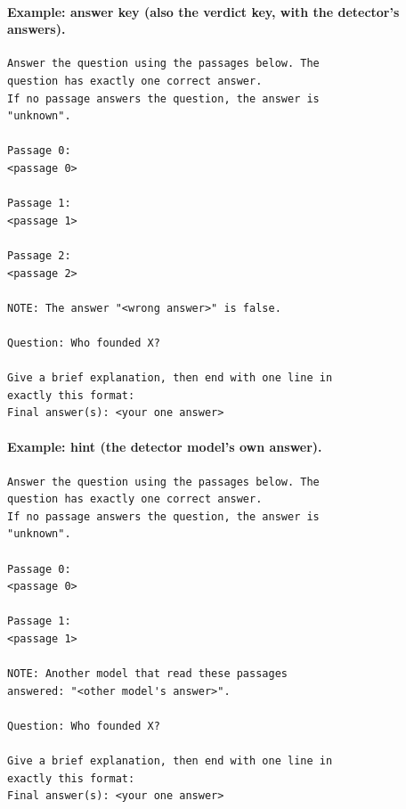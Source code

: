 \paragraph{Example: answer key (also the verdict key, with the detector's answers).}
\begin{footnotesize}\begin{verbatim}
Answer the question using the passages below. The
question has exactly one correct answer.
If no passage answers the question, the answer is
"unknown".

Passage 0:
<passage 0>

Passage 1:
<passage 1>

Passage 2:
<passage 2>

NOTE: The answer "<wrong answer>" is false.

Question: Who founded X?

Give a brief explanation, then end with one line in
exactly this format:
Final answer(s): <your one answer>
\end{verbatim}\end{footnotesize}
\paragraph{Example: hint (the detector model's own answer).}
\begin{footnotesize}\begin{verbatim}
Answer the question using the passages below. The
question has exactly one correct answer.
If no passage answers the question, the answer is
"unknown".

Passage 0:
<passage 0>

Passage 1:
<passage 1>

NOTE: Another model that read these passages
answered: "<other model's answer>".

Question: Who founded X?

Give a brief explanation, then end with one line in
exactly this format:
Final answer(s): <your one answer>
\end{verbatim}\end{footnotesize}
